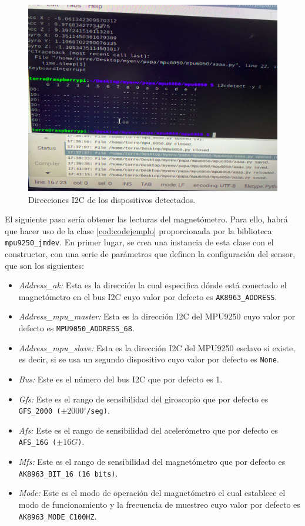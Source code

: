 \begin{figure}[H]
  \centering
  \includegraphics[scale=0.3]{figs/bus} %
  \caption{ Direcciones I2C de los dispositivos detectados.}
  \label{fig:bus}
\end{figure}

El siguiente paso sería obtener las lecturas del magnetómetro. Para ello, habrá que hacer uso de la clase \ref{cod:codejemplo} proporcionada por la biblioteca \texttt{mpu9250\_jmdev}. En primer lugar, se crea una instancia de esta clase con el constructor, con una serie de parámetros que definen la configuración del sensor, que son los siguientes:

\begin{itemize}
 \item \textit{Address\_ak:} Esta es la dirección la cual especifica dónde está conectado el magnetómetro en el bus I2C cuyo valor por defecto es \texttt{AK8963\_ADDRESS}.
 \item \textit{Address\_mpu\_master:} Esta es la dirección I2C del MPU9250 cuyo valor por defecto es \texttt{MPU9050\_ADDRESS\_68}.
 \item \textit{Address\_mpu\_slave:} Esta es la dirección I2C del MPU9250 esclavo si existe, es decir, si se usa un segundo dispositivo cuyo valor por defecto es \texttt{None}.
 \item \textit{Bus:} Este es el número del bus I2C que por defecto es 1.
 \item \textit{Gfs:} Este es el rango de sensibilidad del giroscopio que por defecto es \texttt{GFS\_2000 ($\pm 2000^\circ$/seg)}.
 \item \textit{Afs:} Este es el rango de sensibilidad del acelerómetro que por defecto es \texttt{AFS\_16G ($\pm 16G$)}.
 \item \textit{Mfs:} Este es el rango de sensibilidad del magnetómetro que por defecto es \texttt{AK8963\_BIT\_16 (16 bits)}.
 \item \textit{Mode:} Este es el modo de operación del magnetómetro el cual establece el modo de funcionamiento y la frecuencia de muestreo cuyo valor por defecto es \texttt{AK8963\_MODE\_C100HZ}.
\end{itemize}


